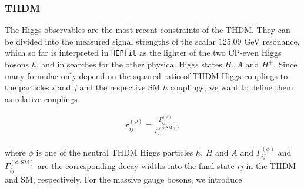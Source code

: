 \documentclass[preprint,3p,12pt]{elsarticle}
\newcommand{\HEPfit}{\texttt{HEPfit}\xspace}
\begin{document}






\subsubsection{THDM}

The Higgs observables are the most recent constraints of the THDM. They can be divided into the measured signal strengths of the scalar $125.09$ GeV resonance, which so far is interpreted in \HEPfit as the lighter of the two CP-even Higgs bosons $h$, and in searches for the other physical Higgs states $H$, $A$ and $H^+$. Since many formulae only depend on the squared ratio of THDM Higgs couplings to the particles $i$ and $j$ and the respective SM $h$ couplings, we want to define them as relative couplings

\begin{align}
 r_{ij}^{(\phi)}=\frac{\Gamma_{ij}^{(\phi)}}{\Gamma_{ij}^{(\phi,\text{SM})}}, \nonumber
\end{align}

where $\phi$ is one of the neutral THDM Higgs particles $h$, $H$ and $A$ and $\Gamma_{ij}^{(\phi)}$ and $\Gamma_{ij}^{(\phi,\text{SM})}$ are the corresponding decay widths into the final state $ij$ in the THDM and SM, respectively. For the massive gauge bosons, we introduce
\end{document}
